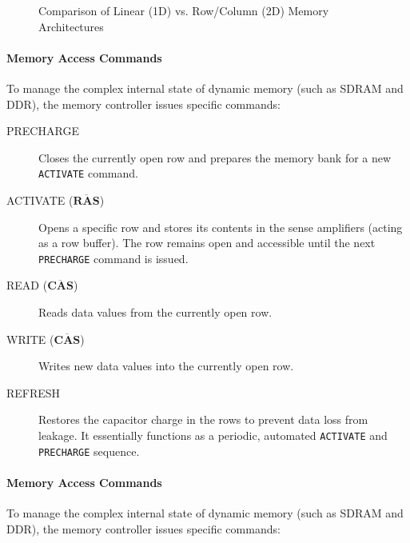 \begin{figure}[htbp]
    \caption{Comparison of Linear (1D) vs. Row/Column (2D) Memory Architectures}
    \label{fig:memory-org}
\end{figure}

\paragraph{Memory Access Commands}
To manage the complex internal state of dynamic memory (such as SDRAM and DDR), the memory controller issues specific commands:

\begin{description}
    \item[PRECHARGE] Closes the currently open row and prepares the memory bank for a new \texttt{ACTIVATE} command.
    \item[ACTIVATE (\(\overline{\textbf{RAS}}\))] Opens a specific row and stores its contents in the sense amplifiers (acting as a row buffer). The row remains open and accessible until the next \texttt{PRECHARGE} command is issued.
    \item[READ (\(\overline{\textbf{CAS}}\))] Reads data values from the currently open row.
    \item[WRITE (\(\overline{\textbf{CAS}}\))] Writes new data values into the currently open row.
    \item[REFRESH] Restores the capacitor charge in the rows to prevent data loss from leakage. It essentially functions as a periodic, automated \texttt{ACTIVATE} and \texttt{PRECHARGE} sequence.
\end{description}

\paragraph{Memory Access Commands}
To manage the complex internal state of dynamic memory (such as SDRAM and DDR), the memory controller issues specific commands:

